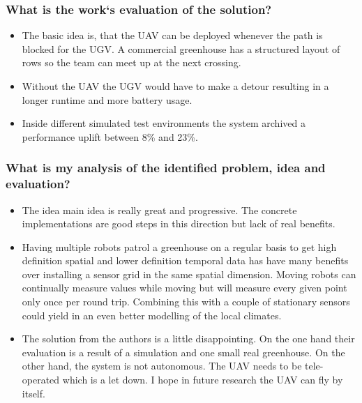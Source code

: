 \documentclass{article}
\begin{document}
\subsubsection*{What is the work`s evaluation of the solution?}
\begin{itemize}
    \item The basic idea is, that the UAV can be deployed whenever the path is blocked for the UGV. A commercial greenhouse has a structured layout of rows so the team can meet up at the next crossing.
    \item Without the UAV the UGV would have to make a detour resulting in a longer runtime and more battery usage.
    \item Inside different simulated test environments the system archived a performance uplift between 8\% and 23\%.
\end{itemize}
\subsubsection*{What is my analysis of the identified problem, idea and evaluation?}
\begin{itemize}
    \item The idea main idea is really great and progressive. The concrete implementations are good steps in this direction but lack of real benefits.
    \item Having multiple robots patrol a greenhouse on a regular basis to get high definition spatial and lower definition temporal data has have many benefits over installing 
    a sensor grid in the same spatial dimension. Moving robots can continually measure values while moving but will measure every given point only once per round trip. Combining this
    with a couple of stationary sensors could yield in an even better modelling of the local climates.
    \item The solution from the authors is a little disappointing. On the one hand their evaluation is a result of a simulation and one small real greenhouse. On the other hand,
    the system is not autonomous. The UAV needs to be tele-operated which is a let down. I hope in future research the UAV can fly by itself.
\end{itemize}
\end{document}
